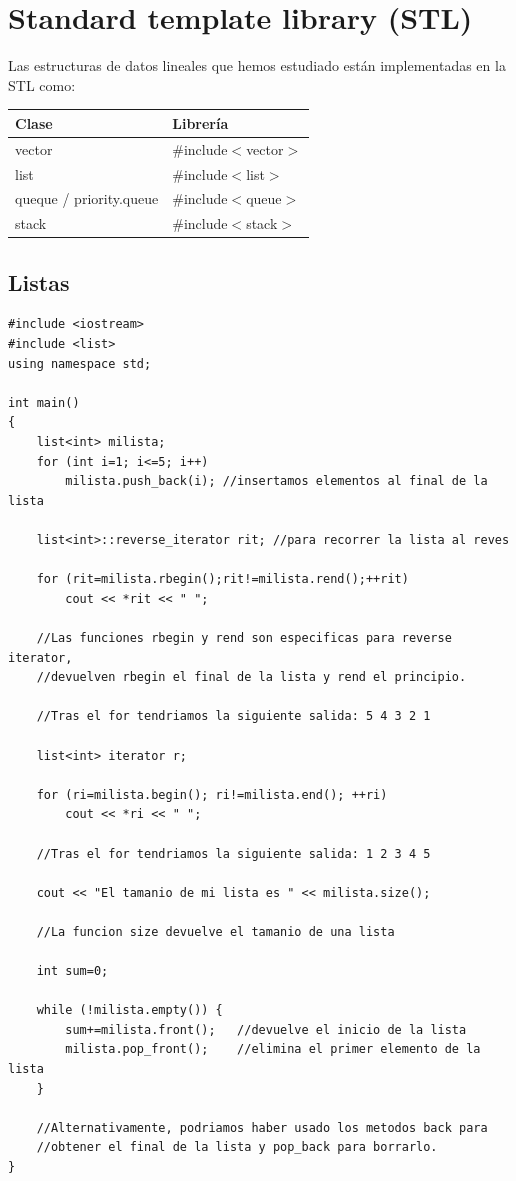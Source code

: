 \documentclass[10pt,a4paper,spanish]{report}
\begin{document}
\section{\textcolor[rgb]{0.2,0.5,0.5}Standard template library (STL)}
\noindent
Las estructuras de datos lineales que hemos estudiado están implementadas en la STL como:


\begin{tabular}{p{5cm} | p{4cm}}
\textbf{Clase} & \textbf{Librería} \\
\hline
vector & \#include$<$vector$>$ \\
list & \#include$<$list$>$ \\
queque / priority.queue & \#include$<$queue$>$ \\
stack & \#include$<$stack$>$ \\
\end{tabular}

\subsection{\textcolor[rgb]{0.2,0.5,0.5}Listas}
\begin{verbatim}
#include <iostream>
#include <list>
using namespace std;

int main()
{
    list<int> milista;
    for (int i=1; i<=5; i++)
        milista.push_back(i); //insertamos elementos al final de la lista

    list<int>::reverse_iterator rit; //para recorrer la lista al reves
    
    for (rit=milista.rbegin();rit!=milista.rend();++rit)
        cout << *rit << " ";

    //Las funciones rbegin y rend son especificas para reverse iterator,
    //devuelven rbegin el final de la lista y rend el principio.

    //Tras el for tendriamos la siguiente salida: 5 4 3 2 1

    list<int> iterator r;

    for (ri=milista.begin(); ri!=milista.end(); ++ri)
        cout << *ri << " ";

    //Tras el for tendriamos la siguiente salida: 1 2 3 4 5

    cout << "El tamanio de mi lista es " << milista.size();

    //La funcion size devuelve el tamanio de una lista

    int sum=0;

    while (!milista.empty()) {
        sum+=milista.front();   //devuelve el inicio de la lista
        milista.pop_front();    //elimina el primer elemento de la lista
    }

    //Alternativamente, podriamos haber usado los metodos back para
    //obtener el final de la lista y pop_back para borrarlo.
}
\end{verbatim}
\end{document}
